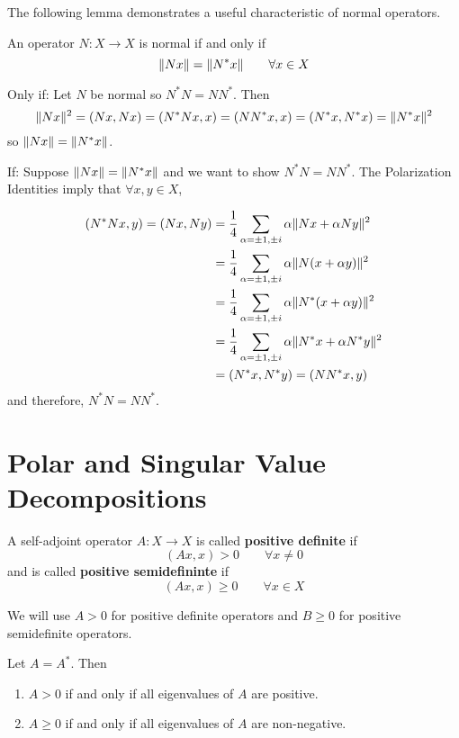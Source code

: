 The following lemma demonstrates a useful characteristic of normal operators. 

\begin{lemma}
An operator $N: X \rightarrow X$ is normal if and only if 
$$\lVert Nx\rVert = \lVert N^{*} x\rVert \qquad \forall x \in X$$
\end{lemma}

\begin{lproof}
Only if: Let $N$ be normal so $N^{*}N = NN^{*}$. Then 
$$\lVert Nx\rVert^{2} = (Nx, Nx) = (N^{*}Nx, x) = (NN^{*} x, x) = (N^{*} x, N^{*} x) = \lVert N^{*} x\rVert^{2} $$
so $\lVert Nx\rVert = \lVert N^{*} x\rVert$.

If: Suppose $\lVert Nx\rVert = \lVert N^{*} x\rVert$ and we want to show $N^{*}N = NN^{*}$. The Polarization Identities imply that $ \forall x, y \in X$, 

$$
\begin{aligned} 
(N^{*}N x, y) = (Nx, Ny) &= \frac{1}{4} \sum_{\alpha = \pm 1, \pm i} \alpha \lVert Nx + \alpha Ny\rVert^{2} \\
&= \frac{1}{4} \sum_{\alpha = \pm 1, \pm i} \alpha \lVert N( x + \alpha y)\rVert^{2} \\
&= \frac{1}{4} \sum_{\alpha = \pm 1, \pm i} \alpha \lVert N^{*} ( x + \alpha y)\rVert^{2} \\
&= \frac{1}{4} \sum_{\alpha = \pm 1, \pm i} \alpha \lVert N^{*} x + \alpha N^{*} y\rVert^{2} \\
&= (N^{*} x, N^{*} y) = (NN^{*} x, y)
\end{aligned} 
$$
and therefore, $N^{*}N = NN^{*}$. 
\end{lproof}

\section{Polar and Singular Value Decompositions}

\begin{definition}
A self-adjoint operator $A: X \rightarrow X$ is called \textbf{positive definite} if 
$$(Ax, x) > 0 \qquad \forall x \neq 0$$
and is called \textbf{positive semidefininte} if 
$$(Ax, x) \geq 0 \qquad \forall x \in X$$

We will use $A > 0$ for positive definite operators and $B \geq 0$ for positive semidefinite operators. 
\end{definition}

\begin{theorem}
Let $A = A^{*}$. Then 
\begin{enumerate}
	\item $A > 0$ if and only if all eigenvalues of $A$ are positive. 
	\item $A \geq 0$ if and only if all eigenvalues of $A$ are non-negative. 
\end{enumerate}
\end{theorem}

